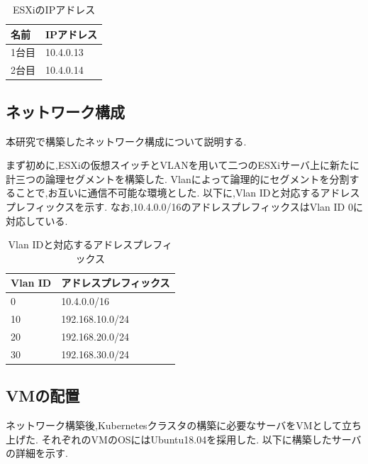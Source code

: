 \begin{table}[htb]
  \begin{center}
    \caption{ESXiのIPアドレス}
    \begin{tabular}{|l|l|} \hline
      名前 & IPアドレス \\ \hline
      1台目 & 10.4.0.13 \\ \hline
      2台目 & 10.4.0.14 \\ \hline
    \end{tabular}
  \end{center}
\end{table}

\subsection{ネットワーク構成}
\label{implementation:network-environment}

本研究で構築したネットワーク構成について説明する.

まず初めに,ESXiの仮想スイッチとVLANを用いて二つのESXiサーバ上に新たに計三つの論理セグメントを構築した.
Vlanによって論理的にセグメントを分割することで,お互いに通信不可能な環境とした.
以下に,Vlan IDと対応するアドレスプレフィックスを示す.
なお,10.4.0.0/16のアドレスプレフィックスはVlan ID 0に対応している.

\begin{table}[htb]
  \begin{center}
    \caption{Vlan IDと対応するアドレスプレフィックス}
    \begin{tabular}{|l|l|} \hline
      Vlan ID & アドレスプレフィックス \\ \hline
      0 & 10.4.0.0/16 \\ \hline
      10 & 192.168.10.0/24 \\ \hline
      20 & 192.168.20.0/24 \\ \hline
      30 & 192.168.30.0/24 \\ \hline
    \end{tabular}
  \end{center}
\end{table}

\subsection{VMの配置}

ネットワーク構築後,Kubernetesクラスタの構築に必要なサーバをVMとして立ち上げた.
それぞれのVMのOSにはUbuntu18.04を採用した.
以下に構築したサーバの詳細を示す.


